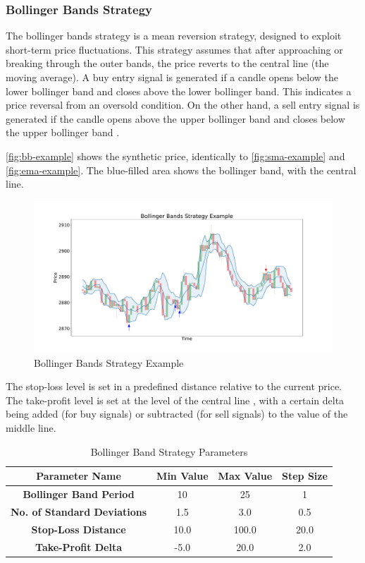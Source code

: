 \subsubsection{Bollinger Bands Strategy}

The bollinger bands strategy is a mean reversion strategy, designed to exploit short-term price fluctuations.
This strategy assumes that after approaching or breaking through the outer bands, the price reverts to the central line (the moving average).
A buy entry signal is generated if a candle opens below the lower bollinger band and closes above the lower bollinger band.
This indicates a price reversal from an oversold condition.
On the other hand, a sell entry signal is generated if the candle opens above the upper bollinger band and closes below the upper bollinger band \cite{bb-basics}.

\autoref{fig:bb-example} shows the synthetic price, identically to \autoref{fig:sma-example} and \autoref{fig:ema-example}.
The blue-filled area shows the bollinger band, with the central line.

\begin{figure}[H]
    \centering
    \includegraphics[width=\textwidth]{images/trading-strategies/bb-example}
    \caption{Bollinger Bands Strategy Example}
    \label{fig:bb-example}
\end{figure}

The stop-loss level is set in a predefined distance relative to the current price.
The take-profit level is set at the level of the central line , with a certain delta being added (for buy signals) or subtracted (for sell signals) to the value of the middle line.

\begin{table}[H]
    \centering
    \begin{tabular}{cccc}
        \toprule
        Parameter Name & Min Value & Max Value & Step Size
        \\
        \midrule
        \textbf{Bollinger Band Period}      & 10   & 25    & 1    \\
        \textbf{No. of Standard Deviations} & 1.5  & 3.0   & 0.5  \\
        \textbf{Stop-Loss Distance}         & 10.0 & 100.0 & 20.0 \\
        \textbf{Take-Profit Delta}          & -5.0 & 20.0  & 2.0  \\
        \bottomrule
    \end{tabular}
    \caption{Bollinger Band Strategy Parameters}
    \label{tbl:bb-strategy-parameters}
\end{table}

